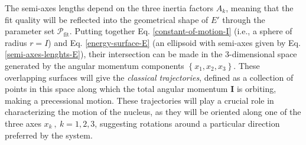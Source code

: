 The semi-axes lengths depend on the three inertia factors $A_k$, meaning that the fit quality will be reflected into the geometrical shape of $E'$ through the parameter set $\mathcal{P}_\text{fit}$. Putting together Eq. \ref{constant-of-motion-I} (i.e., a sphere of radius $r=I$) and Eq. \ref{energy-surface-E} (an ellipsoid with semi-axes given by Eq. \ref{semi-axes-lenghts-E}), their intersection can be made in the 3-dimensional space generated by the angular momentum components $\left\{x_1,x_2,x_3\right\}$. These overlapping surfaces will give the \emph{classical trajectories}, defined as a collection of points in this space along which the total angular momentum $\mathbf{I}$ is orbiting, making a precessional motion. These trajectories will play a crucial role in characterizing the motion of the nucleus, as they will be oriented along one of the three axes $x_k\ ,\ k=1,2,3$, suggesting rotations around a particular direction preferred by the system.

